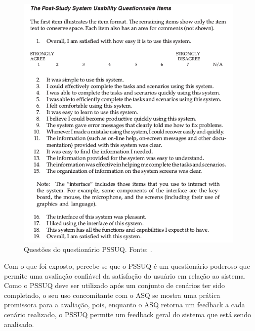       \begin{figure}[!htpb]
	\centering
	\includegraphics[scale=0.7]{editaveis/figuras/pssuq_questions}
	\caption[Questões do questionário PSSUQ]{Questões do questionário PSSUQ. Fonte: \cite{lewis02}.}
	\label{pssuq_questions}
      \end{figure}
      
      Com o que foi exposto, percebe-se que o PSSUQ é um questionário poderoso que permite uma avaliação confiável da
      satisfação do usuário em relação ao sistema. Como o PSSUQ deve ser utilizado após um conjunto de cenários ter sido
      completado, o seu uso concomitante com o ASQ se mostra uma prática promissora para a avaliação, pois, enquanto o ASQ
      retorna um feedback a cada cenário realizado, o PSSUQ permite um feedback geral do sistema que está sendo analisado.